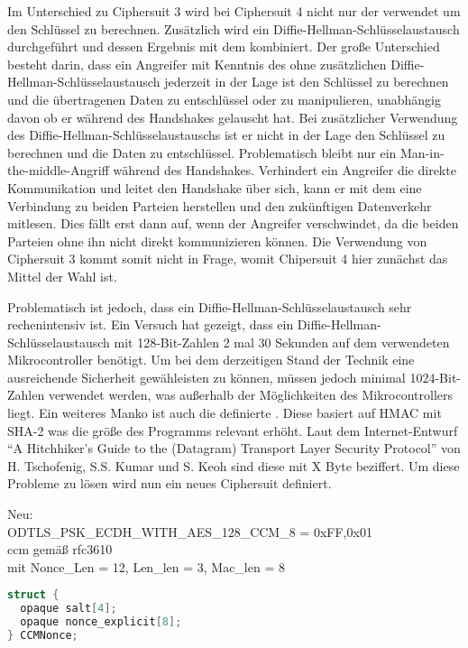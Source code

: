 Im Unterschied zu Ciphersuit 3 wird bei Ciphersuit 4 nicht nur der  verwendet um den Schlüssel zu berechnen. Zusätzlich wird ein
Diffie-Hellman-Schlüsselaustausch durchgeführt und dessen Ergebnis mit dem  kombiniert. Der große Unterschied besteht darin, dass
ein Angreifer mit Kenntnis des  ohne zusätzlichen Diffie-Hellman-Schlüsselaustausch jederzeit in der Lage ist den Schlüssel zu
berechnen und die übertragenen Daten zu entschlüssel oder zu manipulieren, unabhängig davon ob er während des Handshakes gelauscht hat.
Bei zusätzlicher Verwendung des Diffie-Hellman-Schlüsselaustauschs ist er nicht in der Lage den Schlüssel zu berechnen und die Daten zu
entschlüssel. Problematisch bleibt nur ein Man-in-the-middle-Angriff während des Handshakes. Verhindert ein Angreifer die direkte
Kommunikation und leitet den Handshake über sich, kann er mit dem  eine Verbindung zu beiden Parteien herstellen und den
zukünftigen Datenverkehr mitlesen. Dies fällt erst dann auf, wenn der Angreifer verschwindet, da die beiden Parteien ohne ihn nicht
direkt kommunizieren können. Die Verwendung von Ciphersuit 3 kommt somit nicht in Frage, womit Chipersuit 4 hier zunächst das Mittel
der Wahl ist.

Problematisch ist jedoch, dass ein Diffie-Hellman-Schlüsselaustausch sehr rechenintensiv ist. Ein Versuch hat gezeigt,
dass ein Diffie-Hellman-Schlüsselaustausch mit 128-Bit-Zahlen 2 mal 30 Sekunden auf dem verwendeten Mikrocontroller benötigt.
Um bei dem derzeitigen Stand der Technik eine ausreichende Sicherheit gewähleisten zu können, müssen jedoch minimal 1024-Bit-Zahlen
verwendet werden, was außerhalb der Möglichkeiten des Mikrocontrollers liegt. Ein weiteres Manko ist auch die definierte .
Diese basiert auf HMAC mit SHA-2  was die größe des Programms relevant erhöht. Laut dem Internet-Entwurf "`A Hitchhiker's
Guide to the (Datagram) Transport Layer Security Protocol"' \cite{draftmintls} von H. Tschofenig, S.S. Kumar und S. Keoh sind diese mit
X Byte  beziffert. Um diese Probleme zu lösen wird nun ein neues Ciphersuit definiert.

Neu:\\
ODTLS\_PSK\_ECDH\_WITH\_AES\_128\_CCM\_8 = {0xFF,0x01}\\
ccm gemäß rfc3610 \cite{rfc3610}\\
mit Nonce\_Len = 12, Len\_len = 3, Mac\_len = 8\\
\begin{lstlisting}[language=c]
struct {
  opaque salt[4];
  opaque nonce_explicit[8];
} CCMNonce;
\end{lstlisting}

